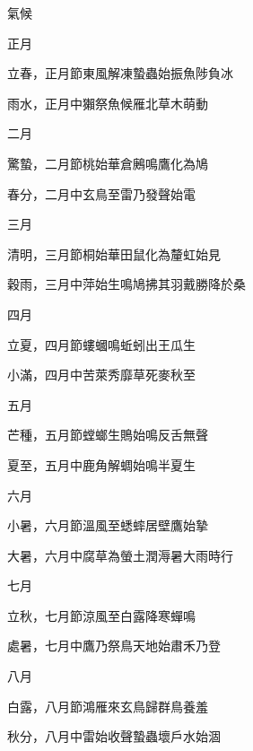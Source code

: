\begin{pinyinscope}
 氣候



 正月



 立春，正月節東風解凍蟄蟲始振魚陟負冰



 雨水，正月中獺祭魚候雁北草木萌動



 二月



 驚蟄，二月節桃始華倉鶊鳴鷹化為鳩



 春分，二月中玄鳥至雷乃發聲始電



 三月



 清明，三月節桐始華田鼠化為釐虹始見



 穀雨，三月中萍始生鳴鳩拂其羽戴勝降於桑



 四月



 立夏，四月節螻蟈鳴蚯蚓出王瓜生



 小滿，四月中苦萊秀靡草死麥秋至



 五月



 芒種，五月節螳螂生鵙始鳴反舌無聲



 夏至，五月中鹿角解蜩始鳴半夏生



 六月



 小暑，六月節溫風至蟋蟀居壁鷹始摯



 大暑，六月中腐草為螢土潤溽暑大雨時行



 七月



 立秋，七月節涼風至白露降寒蟬鳴



 處暑，七月中鷹乃祭鳥天地始肅禾乃登



 八月



 白露，八月節鴻雁來玄鳥歸群鳥養羞



 秋分，八月中雷始收聲蟄蟲壞戶水始涸




\end{pinyinscope}
